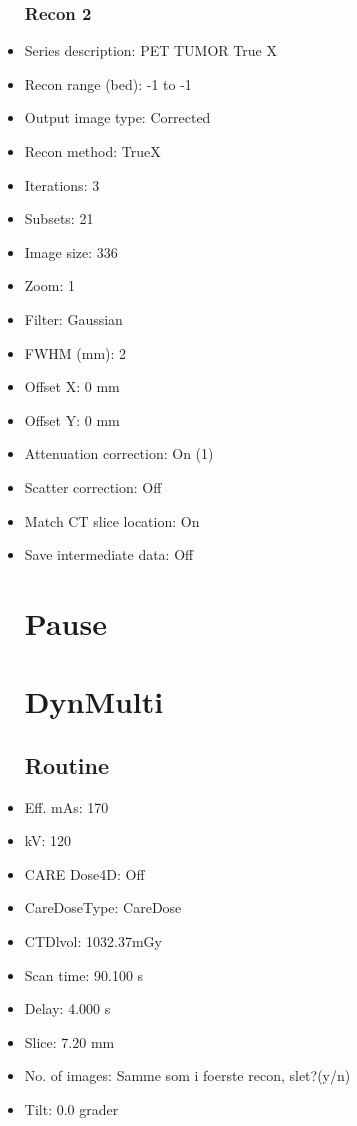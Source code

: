 \documentclass[12pt]{article}
\begin{document}
\begin{itemize}[noitemsep]
\subsubsection{Recon 2}
\item Series description: PET TUMOR True X
\item Recon range (bed): -1 to -1
\item Output image type: Corrected
\item Recon method: TrueX
\item Iterations: 3
\item Subsets: 21
\item Image size: 336
\item Zoom: 1
\item Filter: Gaussian
\item FWHM (mm): 2
\item Offset X: 0 mm
\item Offset Y: 0 mm
\item Attenuation correction: On (1)
\item Scatter correction: Off
\item Match CT slice location: On
\item Save intermediate data: Off
\section{Pause}

\section{DynMulti}
\subsection{Routine}
\item Eff. mAs: 170\item kV: 120\item CARE Dose4D: Off\item CareDoseType: CareDose\item CTDlvol: 1032.37mGy\item Scan time: 90.100 s\item Delay: 4.000 s\item Slice: 7.20 mm\item No. of images: Samme som i foerste recon, slet?(y/n)\item Tilt: 0.0 grader

\end{itemize}
\end{document}
